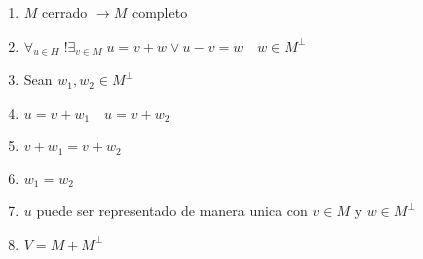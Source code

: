 \begin{enumerate}
	\item $M$ cerrado $\to M$ completo
  \item $\forall_{u \in H} \; !\exists_{v \in M} \; u = v + w \lor u - v = w \quad w \in M^\perp$
  \item Sean $w_1, w_2 \in M^\perp$
  \item $u = v + w_1 \quad u = v + w_2$
  \item $v + w_1 = v + w_2$
  \item $w_1 = w_2$
  \item $u$ puede ser representado de manera unica con $v \in M$ y $w \in M^\perp$
  \item $V = M + M^\perp$
\end{enumerate}
